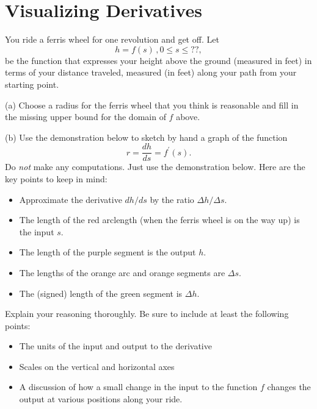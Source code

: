 \documentclass{ximera}
\begin{document}
\section{Visualizing Derivatives}
\begin{question}  \label{Qdfgtt5ttt55}

You ride a ferris wheel for one revolution and get off. Let 
\[
    h = f(s) \, , 0\leq s \leq ??,
\]
be the function that expresses your height above the ground (measured in feet) in terms of your distance traveled, measured (in feet) along your path from your starting point.

(a) Choose a radius for the ferris wheel that you think is reasonable and fill in the missing upper bound for the domain of $f$ above.

(b) Use the demonstration below to sketch by hand a graph of the function 
\[
     r = \frac{dh}{ds} = f^\prime(s) .
\] 
Do \emph{not} make any computations. Just use the demonstration below. Here are the key points to keep in mind:

\begin{itemize}
\item{Approximate the derivative $dh/ds$ by the ratio $\Delta h / \Delta s$}.

\item{The length of the red arclength (when the ferris wheel is on the way up) is the input $s$. }

\item{The length of the purple segment is the output $h$.}

\item{The lengths of the orange arc and orange segments are $\Delta s$.}

\item{The (signed) length of the green segment is  $\Delta h$.}

\end{itemize}




Explain your reasoning thoroughly. Be sure to include at least the following points:

\begin{itemize}
\item{The units of the input and output to the derivative}

\item{Scales on the vertical and horizontal axes}

\item{A discussion of how a small change in the input to the function $f$ changes the output at various positions along your ride. }


\end{itemize}
\end{question}
\end{document}
